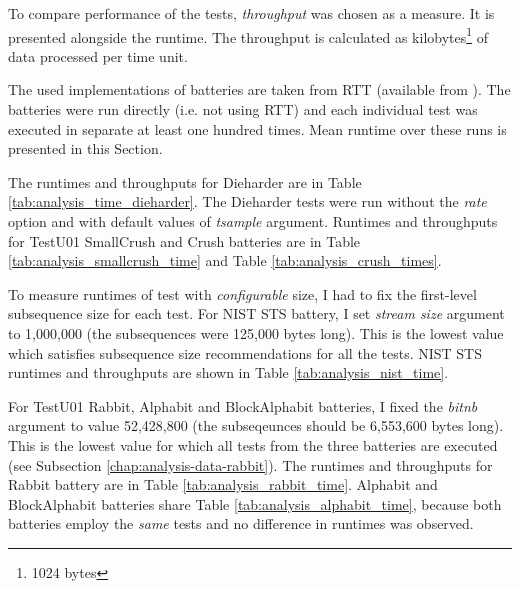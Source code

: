 \documentclass[
  digital,     %
  oneside,     %
  nosansbold,  %
  nocolorbold, %
  nolof,         %
  nolot,         %
]{fithesis4}
\begin{document}
To compare performance of the tests, \emph{throughput} was chosen as a measure. It is presented alongside the runtime. The throughput is calculated as kilobytes\footnote{1024 bytes} of data processed per time unit. 

The used implementations of batteries are taken from RTT (available from \cite{rtt-batteries}). The batteries were run directly (i.e. not using RTT) and each individual test was executed in separate at least one hundred times. Mean runtime over these runs is presented in this Section.

The runtimes and throughputs for Dieharder are in Table \ref{tab:analysis_time_dieharder}. The Dieharder tests were run without the \emph{rate} option and with default values of \emph{tsample} argument. Runtimes and throughputs for TestU01 SmallCrush and Crush batteries are in Table \ref{tab:analysis_smallcrush_time} and Table \ref{tab:analysis_crush_times}.

To measure runtimes of test with \emph{configurable} size, I had to fix the first-level subsequence size for each test. For NIST STS battery, I set \emph{stream size} argument to 1,000,000 (the subsequences were 125,000  bytes long). This is the lowest value which satisfies subsequence size recommendations for all the tests. \cite{nist_special} NIST STS runtimes and throughputs are shown in Table \ref{tab:analysis_nist_time}.

For TestU01 Rabbit, Alphabit and BlockAlphabit batteries, I fixed the \emph{bit\textunderscore nb} argument to value 52,428,800 (the subseqeunces should be 6,553,600 bytes long). This is the lowest value for which all tests from the three batteries are executed (see Subsection \ref{chap:analysis-data-rabbit}). The runtimes and throughputs for Rabbit battery are in Table \ref{tab:analysis_rabbit_time}. Alphabit and BlockAlphabit batteries share Table \ref{tab:analysis_alphabit_time}, because both batteries employ the \emph{same} tests and no difference in runtimes was observed.
\end{document}
